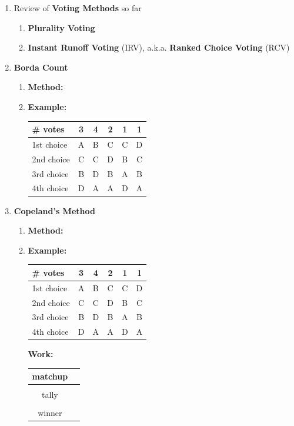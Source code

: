 \documentclass[12pt]{article}
\renewcommand{\emph}[1]{\textsf{\textbf{#1}}}
\begin{document}
\begin{enumerate}
\item Review of \emph{Voting Methods} so far\\
	\begin{enumerate}
	\item \emph{Plurality Voting}
	\vspace{1in}
	\item \emph{Instant Runoff Voting} (IRV), a.k.a. \emph{Ranked Choice Voting} (RCV)
	\vfill
	\end{enumerate}
\item \emph{Borda Count}
	\begin{enumerate}
	\item \emph{Method:}
	\vspace{1.5in}
	\item \emph{Example:}
	
	\begin{tabular}{l || c |c|c|c|c}
\# votes&3&4&2&1&1\\
\hline
1st choice&A&B&C&C&D\\
2nd choice&C&C&D&B&C\\
3rd choice&B&D&B&A&B\\
4th choice&D&A&A&D&A\\
\end{tabular}
	\vfill
	\end{enumerate}
\newpage
\item \emph{Copeland's Method}
	\begin{enumerate}
	\item \emph{Method:}
	\vspace{1.5in}
	\item \emph{Example:}
	
	\begin{tabular}{l || c |c|c|c|c}
\# votes&3&4&2&1&1\\
\hline
1st choice&A&B&C&C&D\\
2nd choice&C&C&D&B&C\\
3rd choice&B&D&B&A&B\\
4th choice&D&A&A&D&A\\
\end{tabular}

\vspace{.2in}

\textbf{Work:  } \\
\vspace{.2in}

\begin{tabular}{c || l }
matchup & \quad \hspace{5in} \quad \\
 \hline
 &\\
 tally&\\
 &\\
 \hline
 winner & \\
 \end{tabular}
 
	
	\end{enumerate}
\vfill
\end{enumerate}
\end{document}
